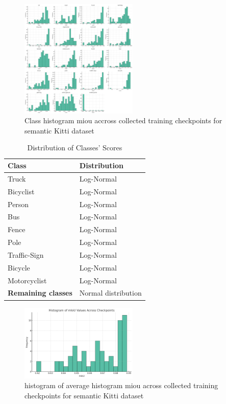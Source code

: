 \documentclass[10pt,twocolumn,letterpaper]{article}
\begin{document}
\begin{figure}[!h]
    \centering
    \includegraphics[width=0.5\textwidth]{photos/histogram of each class miou accross checkpoints.png}
    \caption{Class histogram miou accross collected training checkpoints for semantic Kitti dataset  }
    \label{fig:photo_example}
\end{figure}

\begin{table}[!h]
\centering
\begin{tabular}{l l}
\hline
\textbf{Class} & \textbf{Distribution} \\
\hline
Truck & Log-Normal \\
Bicyclist & Log-Normal \\
Person & Log-Normal \\
Bus & Log-Normal \\
Fence & Log-Normal \\
Pole & Log-Normal \\
Traffic-Sign & Log-Normal \\
Bicycle & Log-Normal \\
Motorcyclist & Log-Normal \\
\hline
\textbf{Remaining classes} & Normal distribution \\
\hline
\end{tabular}
\caption{Distribution of Classes' Scores}
\label{tab:scores_distribution}
\end{table}



\begin{figure}[!h]
    \centering
    \includegraphics[width=0.5\textwidth]{photos/histogram of average miou of collected semantic kitti checkpoints.png}
    \caption{histogram of average histogram miou across collected training checkpoints for semantic Kitti dataset  }
    \label{fig:photo_example}
\end{figure}
\end{document}
